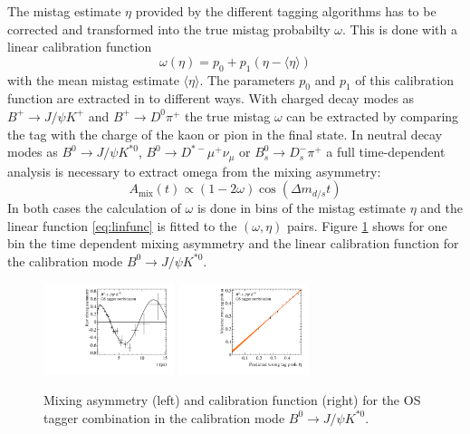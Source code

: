 \documentclass{PoS}
\begin{document}
The mistag estimate $\eta$ provided by the different tagging algorithms has to be corrected and transformed into the true mistag probabilty $\omega$. This is done with a linear calibration function
\begin{equation}
\omega(\eta)=p_0+p_1\left(\eta-\langle\eta\rangle\right)\label{eq:linfunc}
\end{equation}
with the mean mistag estimate $\langle\eta\rangle$. The parameters $p_0$ and $p_1$ of this calibration function are extracted in to different ways. With charged decay modes as $B^+\to J\!/\!\psi K^+$ and $B^+\to D^0\pi^+$ the true mistag $\omega$ can be extracted by comparing the tag with the charge of the kaon or pion in the final state. In neutral decay modes as $B^0\to J\!/\!\psi K^{*0}$, $B^0\to D^{*-}\mu^+\nu_\mu$ or $B_s^0\to D_s^-\pi^+$ a full time-dependent analysis is necessary to extract omega from the mixing asymmetry:
\begin{equation}
A_\text{mix}(t)\propto\left(1-2\omega\right)\cos\left(\Delta m_{d/s} t\right)
\end{equation}
In both cases the calculation of $\omega$ is done in bins of the mistag estimate $\eta$ and the linear function \ref{eq:linfunc} is fitted to the $(\omega,\eta)$ pairs. Figure \ref{fig:calibration} shows for one bin the time dependent mixing asymmetry and the linear calibration function for the calibration mode $B^0\to J\!/\!\psi K^{*0}$. 
\begin{figure}[htbp]
	\begin{center}
		\includegraphics[width=0.34\textwidth, angle=0]{figs/KstAsym.pdf}
		\includegraphics[width=0.34\textwidth, angle=0]{figs/Bd2JpsiKst-Kst-OST-8ScalingFunction_raw.pdf}
		\small{\caption{Mixing asymmetry (left) and calibration function (right) for the OS tagger combination in the calibration mode $B^0\to J\!/\!\psi K^{*0}$.}}
		\label{fig:calibration}
	\end{center}
\end{figure}
\end{document}
